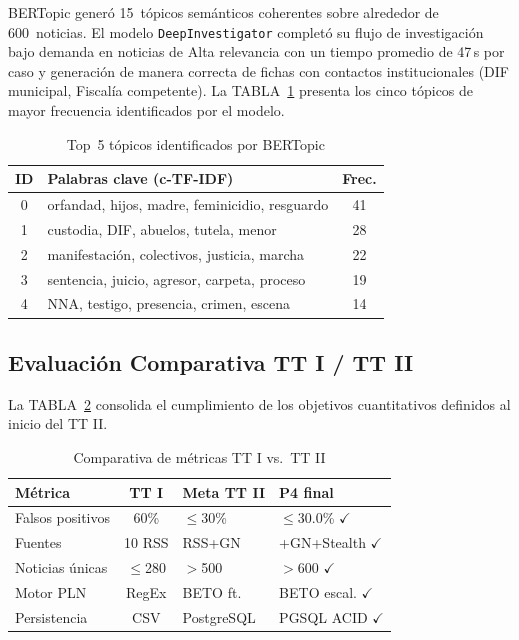 \documentclass[conference]{IEEEtran}
\begin{document}
BERTopic generó 15~tópicos semánticos coherentes sobre alrededor de 600~noticias.
El modelo \texttt{DeepInvestigator} completó su flujo de investigación
bajo demanda en noticias de Alta relevancia con un tiempo promedio de 47\,s por caso
y generación de manera correcta de fichas con contactos institucionales (DIF
municipal, Fiscalía competente). La TABLA~\ref{tab:topicos} presenta
los cinco tópicos de mayor frecuencia identificados por el modelo.

\begin{table}[htbp]
\centering
\caption{Top~5 tópicos identificados por BERTopic}
\label{tab:topicos}
\renewcommand{\arraystretch}{1.2}
\begin{tabular}{c>{\raggedright\arraybackslash}p{3.2cm}c}
\toprule
\textbf{ID} & \textbf{Palabras clave (c-TF-IDF)} & \textbf{Frec.} \\
\midrule
0 & orfandad, hijos, madre, feminicidio, resguardo & 41 \\
1 & custodia, DIF, abuelos, tutela, menor           & 28 \\
2 & manifestación, colectivos, justicia, marcha     & 22 \\
3 & sentencia, juicio, agresor, carpeta, proceso    & 19 \\
4 & NNA, testigo, presencia, crimen, escena         & 14 \\
\bottomrule
\end{tabular}
\end{table}

\subsection{Evaluación Comparativa TT I / TT II}

La \mbox{TABLA~\ref{tab:comparativa}} consolida el cumplimiento de los
objetivos cuantitativos definidos al inicio del TT II.

\begin{table}[htbp]
\centering
\caption{Comparativa de métricas TT I vs.\ TT II}
\label{tab:comparativa}
\renewcommand{\arraystretch}{1.2}
\begin{tabular}{l c >{\centering\arraybackslash}p{1.8cm} >{\raggedright\arraybackslash}p{2.4cm}}
\toprule
\textbf{Métrica} & \textbf{TT I} & \textbf{Meta TT II} & \textbf{P4 final} \\
\midrule
Falsos positivos & 60\%    & $\leq$30\%     & $\leq$30.0\% $\checkmark$ \\
Fuentes          & 10 RSS  & 45 RSS+GN   & 45+GN+Stealth $\checkmark$ \\
Noticias únicas  & $\leq$280     & $>$500         & $>$600 $\checkmark$ \\
Motor PLN        & RegEx   & BETO ft.       & BETO escal. $\checkmark$ \\
Persistencia     & CSV     & PostgreSQL     & PGSQL ACID $\checkmark$ \\
\bottomrule
\end{tabular}
\end{table}
\end{document}
